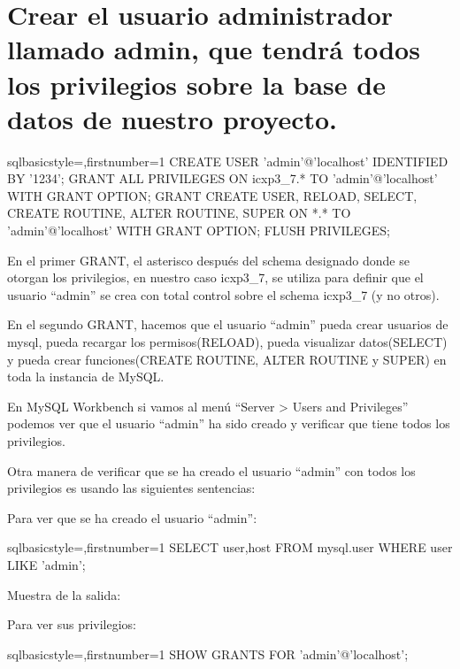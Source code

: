 \section{Crear el usuario administrador llamado admin, que tendrá todos los privilegios sobre la base de datos de nuestro proyecto.}
	\begin{sourcecodep}[]{sql}{basicstyle={\fontsize{10}{10}\selectfont\ttfamily},firstnumber=1}{}
		CREATE USER 'admin'@'localhost' IDENTIFIED BY '1234';
		GRANT ALL PRIVILEGES ON icxp3_7.* TO 'admin'@'localhost' WITH GRANT OPTION;
		GRANT 
		CREATE USER, 
		RELOAD, 
		SELECT, 
		CREATE ROUTINE, 
		ALTER ROUTINE, 
		SUPER 
		ON *.* TO 'admin'@'localhost' 
		WITH GRANT OPTION;
		FLUSH PRIVILEGES;\end{sourcecodep}
	\newp En el primer GRANT, el asterisco después del schema designado donde se otorgan los privilegios, en nuestro caso icxp3\_7, se utiliza para definir que el usuario “admin” se crea con total control sobre el schema icxp3\_7 (y no otros).
	
	\newp En el segundo GRANT, hacemos que el usuario “admin” pueda crear usuarios de mysql, pueda recargar los permisos(RELOAD), pueda visualizar datos(SELECT) y pueda crear funciones(CREATE ROUTINE, ALTER ROUTINE y SUPER) en toda la instancia de MySQL.
	
	\newp En MySQL Workbench si vamos al menú “Server > Users and Privileges” podemos ver que el usuario “admin” ha sido creado y verificar que tiene todos los privilegios.
	
	
	Otra manera de verificar que se ha creado el usuario “admin” con todos los privilegios es usando las siguientes sentencias:
	
	\newp Para ver que se ha creado el usuario “admin”:
	\begin{sourcecodep}[]{sql}{basicstyle={\fontsize{10}{10}\selectfont\ttfamily},firstnumber=1}{}
		SELECT user,host FROM mysql.user WHERE user LIKE 'admin';\end{sourcecodep}
	
	\newp Muestra de la salida:
	
	\newp Para ver sus privilegios:
	\begin{sourcecodep}[]{sql}{basicstyle={\fontsize{10}{10}\selectfont\ttfamily},firstnumber=1}{}
		SHOW GRANTS FOR 'admin'@'localhost';\end{sourcecodep}
	
